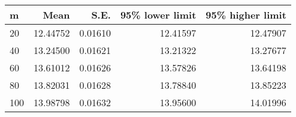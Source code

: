\begin{tabular}{lrrrr}
\toprule
m &      Mean &     S.E. &  95\% lower limit &  95\% higher limit \\
\midrule
20  &  12.44752 &  0.01610 &         12.41597 &          12.47907 \\
40  &  13.24500 &  0.01621 &         13.21322 &          13.27677 \\
60  &  13.61012 &  0.01626 &         13.57826 &          13.64198 \\
80  &  13.82031 &  0.01628 &         13.78840 &          13.85223 \\
100 &  13.98798 &  0.01632 &         13.95600 &          14.01996 \\
\bottomrule
\end{tabular}
